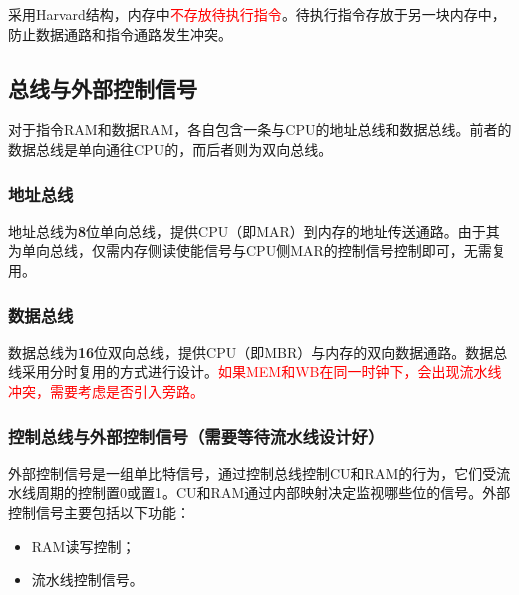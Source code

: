 \documentclass[lang=cn,a4paper,newtx]{elegantpaper}
\begin{document}
采用Harvard结构，内存中\textcolor{red}{不存放待执行指令}。待执行指令存放于另一块内存中，防止数据通路和指令通路发生冲突。
\subsection{总线与外部控制信号}\label{sec:ExternalControl}
对于指令RAM和数据RAM，各自包含一条与CPU的地址总线和数据总线。前者的数据总线是单向通往CPU的，而后者则为双向总线。
\subsubsection{地址总线}
地址总线为\textbf{8}位单向总线，提供CPU（即MAR）到内存的地址传送通路。由于其为单向总线，仅需内存侧读使能信号与CPU侧MAR的控制信号控制即可，无需复用。
\subsubsection{数据总线}
数据总线为\textbf{16}位双向总线，提供CPU（即MBR）与内存的双向数据通路。数据总线采用分时复用的方式进行设计。\textcolor{red}{如果MEM和WB在同一时钟下，会出现流水线冲突，需要考虑是否引入旁路。}
\subsubsection{控制总线与外部控制信号（需要等待流水线设计好）}
外部控制信号是一组单比特信号，通过控制总线控制CU和RAM的行为，它们受流水线周期的控制置0或置1。CU和RAM通过内部映射决定监视哪些位的信号。外部控制信号主要包括以下功能：
\begin{itemize}
  \item RAM读写控制；
  \item 流水线控制信号。
\end{itemize}
\end{document}
